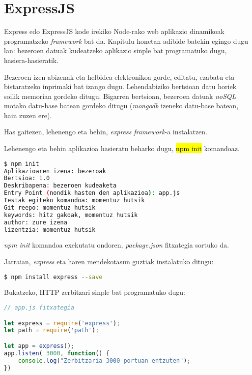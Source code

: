 \chapter{ExpressJS}

Express edo ExpressJS  kode irekiko Node-rako web aplikazio dinamikoak programatzeko \textit{framework} bat da. Kapitulu honetan adibide batekin egingo dugu lan: bezeroen datuak kudeatzeko aplikazio sinple bat programatuko dugu, hasiera-hasieratik.

Bezeroen izen-abizenak eta helbidea elektronikoa gorde, editatu, ezabatu eta bistaratzeko inprimaki bat izango dugu. Lehendabiziko bertsioan datu horiek soilik memorian gordeko ditugu. Bigarren bertsioan, bezeroen datuak \textit{noSQL} motako datu-base batean gordeko ditugu (\textit{mongodb} izeneko datu-base batean, hain zuzen ere).

Has gaitezen, lehenengo eta behin, \textit{express} \textit{framework}-a instalatzen.

Lehenengo eta behin aplikazioa hasieratu beharko dugu, \hl{npm init} komandoaz.


\begin{lstlisting}[language=Bash,numbers=none]
$ npm init
Aplikazioaren izena: bezeroak
Bertsioa: 1.0
Deskribapena: bezeroen kudeaketa
Entry Point (nondik hasten den aplikazioa): app.js
Testak egiteko komandoa: momentuz hutsik
Git reepo: momentuz hutsik
keywords: hitz gakoak, momentuz hutsik
author: zure izena
lizentzia: momentuz hutsik

\end{lstlisting}

\textit{npm init} komandoa exekutatu ondoren, \textit{package.json} fitxategia sortuko da.

Jarraian, \textit{express} eta haren mendekotasun guztiak instalatuko ditugu:

\begin{lstlisting}[language=Bash,numbers=none]
$ npm install express --save
\end{lstlisting}

Bukatzeko, HTTP zerbitzari sinple bat programatuko dugu:

\begin{lstlisting}[language=JavaScript]
// app.js fitxategia

let express = require('express');
let path = require('path');

let app = express();
app.listen( 3000, function() {
	console.log("Zerbitzaria 3000 portuan entzuten");
})
\end{lstlisting}

